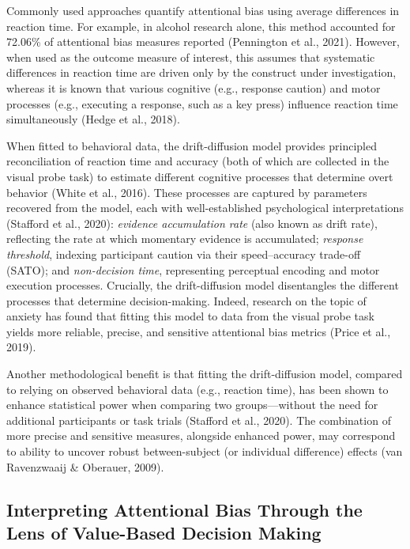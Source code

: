 \documentclass[authordate, reflection, issue]{jote-new-article}
\begin{document}
	Commonly used approaches quantify attentional bias using average differences in reaction time. For example, in alcohol research alone, this method accounted for 72.06\% of attentional bias measures reported (Pennington et al., 2021). However, when used as the outcome measure of interest, this assumes that systematic differences in reaction time are driven only by the construct under investigation, whereas it is known that various cognitive (e.g., response caution) and motor processes (e.g., executing a response, such as a key press) influence reaction time simultaneously (Hedge et al., 2018).



	When fitted to behavioral data, the drift-diffusion model provides principled reconciliation of reaction time and accuracy (both of which are collected in the visual probe task) to estimate different cognitive processes that determine overt behavior (White et al., 2016). These processes are captured by parameters recovered from the model, each with well-established psychological interpretations (Stafford et al., 2020): \emph{evidence accumulation rate} (also known as drift rate), reflecting the rate at which momentary evidence is accumulated; \emph{response threshold}, indexing participant caution via their speed--accuracy trade-off (SATO); and \emph{non-decision time}, representing perceptual encoding and motor execution processes. Crucially, the drift-diffusion model disentangles the different processes that determine decision-making. Indeed, research on the topic of anxiety has found that fitting this model to data from the visual probe task yields more reliable, precise, and sensitive attentional bias metrics (Price et al., 2019).



	Another methodological benefit is that fitting the drift-diffusion model, compared to relying on observed behavioral data (e.g., reaction time), has been shown to enhance statistical power when comparing two groups—without the need for additional participants or task trials (Stafford et al., 2020). The combination of more precise and sensitive measures, alongside enhanced power, may correspond to ability to uncover robust between-subject (or individual difference) effects (van Ravenzwaaij \& Oberauer, 2009).



	\subsection{Interpreting Attentional Bias Through the Lens of Value-Based Decision Making}
\end{document}
